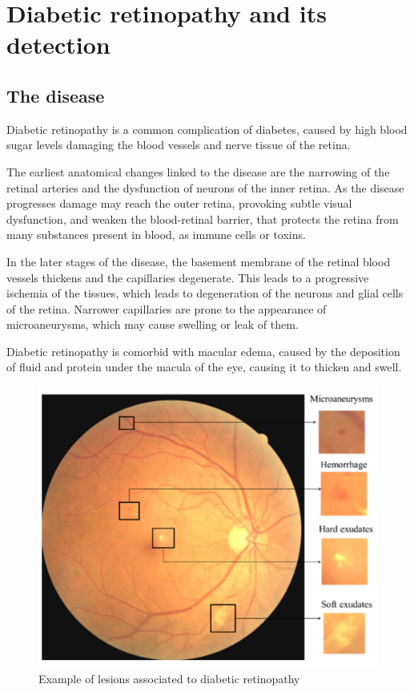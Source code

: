 \chapter{Diabetic retinopathy and its detection}\label{chapter3}
\section{The disease} \label{sec:disease}
Diabetic retinopathy is a common complication of diabetes, caused by high blood sugar levels damaging the blood vessels and nerve tissue of the retina. 

The earliest anatomical changes linked to the disease are the narrowing of the retinal arteries and the dysfunction of neurons of the inner retina. As the disease progresses damage may reach the outer retina, provoking subtle visual dysfunction, and weaken the blood-retinal barrier, that protects the retina from many substances present in blood, as immune cells or toxins.

In the later stages of the disease, the basement membrane of the retinal blood vessels thickens and the capillaries degenerate. This leads to a progressive ischemia of the tissues, which leads to degeneration of the neurons and glial cells of the retina. Narrower capillaries are prone to the appearance of microaneurysms, which may cause swelling or leak of them. 

Diabetic retinopathy is comorbid with macular edema, caused by the deposition of fluid and protein under the macula of the eye, causing it to thicken and swell.

\begin{figure}
    \centering
    \includegraphics[width=\textwidth]{figures/chapter3/lesions.png}
    \caption{Example of lesions associated to diabetic retinopathy\cite{alyoubi2021images}}
    \label{fig:lesions}
\end{figure}

